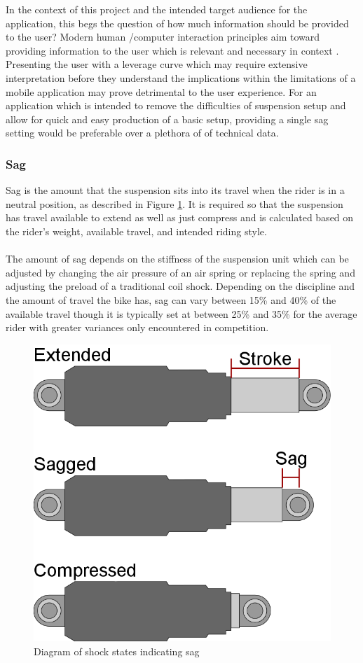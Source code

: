 		In the context of this project and the intended target audience for the application, this begs the question of how much information should be provided to the user? Modern human /computer interaction principles aim toward providing information to the user which is relevant and necessary in context \citep{shneiderman2010designing}. Presenting the user with a leverage curve which may require extensive interpretation before they understand the implications within the limitations of a mobile application may prove detrimental to the user experience. For an application which is intended to remove the difficulties of suspension setup and allow for quick and easy production of a basic setup, providing a single sag setting would be preferable over a plethora of of technical data.	
	\subsubsection{Sag} \label{sec:sag}
		Sag is the amount that the suspension sits into its travel when the rider is in a neutral position, as described in Figure \ref{fig:sag}. It is required so that the suspension has travel available to extend as well as just compress and is calculated based on the rider’s weight, available travel, and intended riding style.
		\\\\
		The amount of sag depends on the stiffness of the suspension unit which can be adjusted by changing the air pressure of an air spring or replacing the spring and adjusting the preload of a traditional coil shock. Depending on the discipline and the	amount of travel the bike has, sag can vary between 15\% and 40\% of the available travel though it is typically set at between 25\% and 35\% for the average rider with greater variances only encountered in competition.
		\begin{figure}[h!]
			\centering
			\includegraphics[scale=0.5]{../images/sag_diagram.png}
			\caption{Diagram of shock states indicating sag}
			\label{fig:sag}
		\end{figure}
